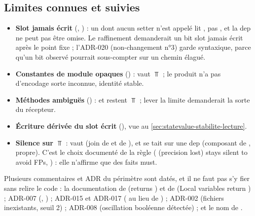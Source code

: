 \subsection{Limites connues et suivies}

\begin{itemize}
  \item \textbf{Slot jamais écrit} (, ) : un
     dont aucun setter n'est appelé lit
    , pas , et la dep ne peut pas être omise.
    Le raffinement demanderait un bit \og slot jamais écrit\fg{} après le
    point fixe ; l'ADR-020 (non-changement n°3) garde
     syntaxique, parce qu'un bit observé pourrait
    sous-compter sur un chemin élagué.
  \item \textbf{Constantes de module opaques} () :  vaut $\Top$ ; le produit n'a pas d'encodage \og sorte inconnue,
    identité stable\fg{}.
  \item \textbf{Méthodes ambiguës} () :  et
     restent $\Top$ ; lever la limite demanderait la sorte du
    récepteur.
  \item \textbf{Écriture dérivée du slot écrit} (), vue au
    \cref{sec:statevalue-stabilite-lecture}.
  \item \textbf{Silence sur $\Top$} :  vaut  (join de  et de
    ), et  se tait sur une dep
     (composant  de , propre). C'est
    le choix documenté de la règle (\og {} (precision lost) stays
    silent to avoid FPs\fg{},
    ) : elle
    n'affirme que des faits must.
\end{itemize}

\begin{piege}
  Plusieurs commentaires et ADR du périmètre sont datés, et il ne faut pas
  s'y fier sans relire le code : la documentation de 
  (\og returns \fg{}) et de  (\og Local variables
  return \fg{}) ; ADR-007 (,
  ) ; ADR-015 et ADR-017 ( au lieu de
  ) ; ADR-002 (fichiers inexistants, seuil 2) ; ADR-008
  (oscillation booléenne détectée) ; et le nom de .
\end{piege}

